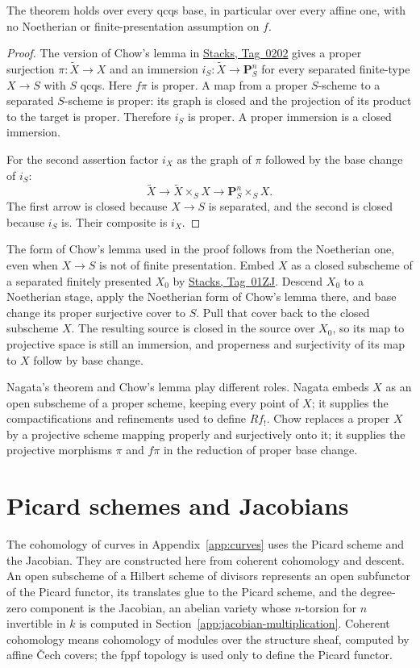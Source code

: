 \documentclass[11pt,a4paper]{article}
\numberwithin{equation}{section}
\theoremstyle{definition}
\theoremstyle{remark}
\newcommand{\stacks}[1]{\href{https://stacks.math.columbia.edu/tag/#1}{\textnormal{Stacks, Tag~#1}}}
\begin{document}
The theorem holds over every qcqs base, in particular over every affine
one, with no Noetherian or finite-presentation assumption on $f$.

\begin{proof}
The version of Chow's lemma in \stacks{0202} gives a proper
surjection $\pi:\widetilde X\to X$ and an immersion
$i_S:\widetilde X\to\mathbf P^n_S$ for every separated finite-type
$X\to S$ with $S$ qcqs. Here $f\pi$ is proper. A map from a proper
$S$-scheme to a separated $S$-scheme is proper: its graph is closed
and the projection of its product to the target is proper. Therefore
$i_S$ is proper. A proper immersion is a closed immersion.

For the second assertion factor $i_X$ as the graph of $\pi$
followed by the base change of $i_S$:
\[
 \widetilde X\longrightarrow\widetilde X\times_SX
 \longrightarrow\mathbf P^n_S\times_SX.
\]
The first arrow is closed because $X\to S$ is separated, and the
second is closed because $i_S$ is. Their composite is $i_X$.
\end{proof}

The form of Chow's lemma used in the proof follows from the Noetherian
one, even when $X\to S$ is not of finite presentation. Embed $X$ as a
closed subscheme of a separated finitely presented $X_0$ by
\stacks{01ZJ}. Descend $X_0$ to a Noetherian stage, apply the
Noetherian form of Chow's lemma there, and base change its proper
surjective cover to $S$. Pull that cover back to the closed subscheme
$X$. The resulting source is closed in the source over $X_0$, so its
map to projective space is still an immersion, and properness and
surjectivity of its map to $X$ follow by base change.

Nagata's theorem and Chow's lemma play different roles. Nagata embeds
$X$ as an open subscheme of a proper scheme, keeping every point of
$X$; it supplies the compactifications and refinements used to define
$Rf_!$. Chow replaces a proper $X$ by a projective scheme mapping
properly and surjectively onto it; it supplies the projective
morphisms $\pi$ and $f\pi$ in the reduction of proper base change.

\section{Picard schemes and Jacobians}
\label{app:picard}

The cohomology of curves in Appendix~\ref{app:curves} uses the Picard
scheme and the Jacobian. They are constructed here from coherent
cohomology and descent. An open subscheme of a Hilbert scheme of
divisors represents an open subfunctor of the Picard functor, its
translates glue to the Picard scheme, and the degree-zero component is
the Jacobian, an abelian variety whose $n$-torsion for $n$ invertible
in $k$ is computed in Section~\ref{app:jacobian-multiplication}.
Coherent cohomology means cohomology of modules over the structure
sheaf, computed by affine \v Cech covers; the fppf topology is used
only to define the Picard functor.
\end{document}
